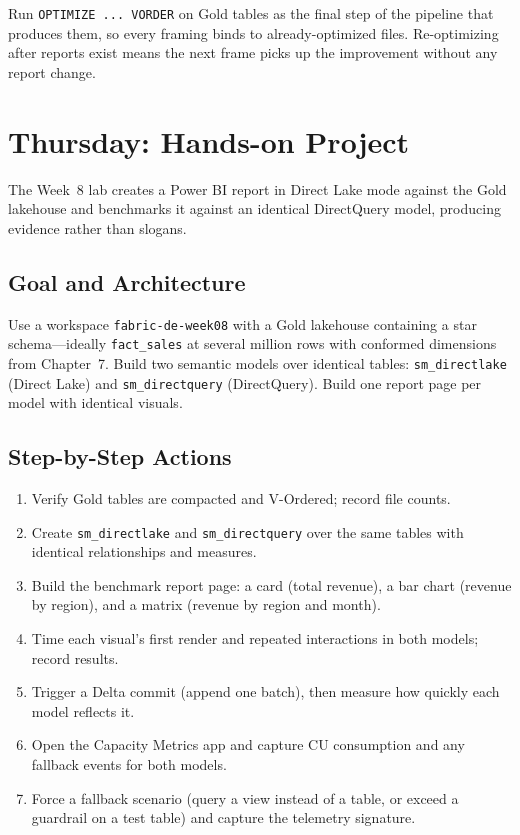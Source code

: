 \begin{tipbox}
Run \texttt{OPTIMIZE ... VORDER} on Gold tables as the final step of the pipeline that produces them, so every framing binds to already-optimized files. Re-optimizing after reports exist means the next frame picks up the improvement without any report change.
\end{tipbox}

\section{Thursday: Hands-on Project}
The Week~8 lab creates a Power BI report in Direct Lake mode against the Gold lakehouse and benchmarks it against an identical DirectQuery model, producing evidence rather than slogans.

\subsection{Goal and Architecture}
Use a workspace \texttt{fabric-de-week08} with a Gold lakehouse containing a star schema---ideally \texttt{fact\_sales} at several million rows with conformed dimensions from Chapter~7. Build two semantic models over identical tables: \texttt{sm\_directlake} (Direct Lake) and \texttt{sm\_directquery} (DirectQuery). Build one report page per model with identical visuals.

\subsection{Step-by-Step Actions}
\begin{enumerate}
    \item Verify Gold tables are compacted and V-Ordered; record file counts.
    \item Create \texttt{sm\_directlake} and \texttt{sm\_directquery} over the same tables with identical relationships and measures.
    \item Build the benchmark report page: a card (total revenue), a bar chart (revenue by region), and a matrix (revenue by region and month).
    \item Time each visual's first render and repeated interactions in both models; record results.
    \item Trigger a Delta commit (append one batch), then measure how quickly each model reflects it.
    \item Open the Capacity Metrics app and capture CU consumption and any fallback events for both models.
    \item Force a fallback scenario (query a view instead of a table, or exceed a guardrail on a test table) and capture the telemetry signature.
\end{enumerate}

